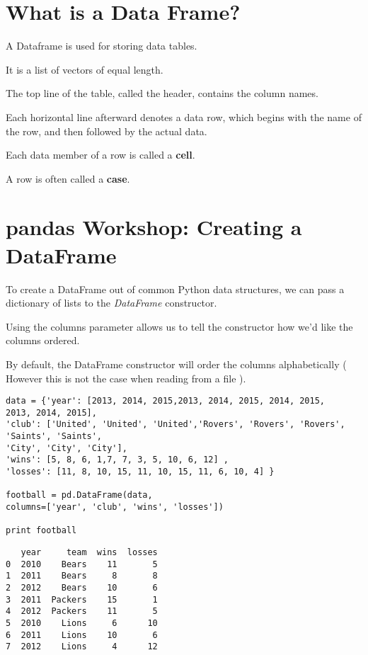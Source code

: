
 

\section*{What is a Data Frame?}
 
\item A Dataframe is used for storing data tables.
\item It is a list of vectors of equal length.
\item The top line of the table, called the header, contains the column names.
\item Each horizontal line afterward denotes a data row, which begins with the name of the row, and then followed by the actual data.
\item Each data member of a row is called a \textbf{cell}.
\item A row is often called a \textbf{case}.
 

\newpage
\section*{pandas Workshop: Creating a DataFrame}
 
\item To create a DataFrame out of common Python data structures, we can pass a dictionary of lists to the \textit{DataFrame} constructor.

\item Using the columns parameter allows us to tell the constructor how we'd like the columns ordered. 
\item By default, the DataFrame constructor will order the columns alphabetically ( However this is not the case when reading from a file ).
 


\begin{framed}
\begin{verbatim}
data = {'year': [2013, 2014, 2015,2013, 2014, 2015, 2014, 2015, 
2013, 2014, 2015],
'club': ['United', 'United', 'United','Rovers', 'Rovers', 'Rovers', 
'Saints', 'Saints', 
'City', 'City', 'City'],
'wins': [5, 8, 6, 1,7, 7, 3, 5, 10, 6, 12] ,
'losses': [11, 8, 10, 15, 11, 10, 15, 11, 6, 10, 4] }

football = pd.DataFrame(data,
columns=['year', 'club', 'wins', 'losses'])

print football
\end{verbatim}
\end{framed}

\begin{verbatim}
   year     team  wins  losses
0  2010    Bears    11       5
1  2011    Bears     8       8
2  2012    Bears    10       6
3  2011  Packers    15       1
4  2012  Packers    11       5
5  2010    Lions     6      10
6  2011    Lions    10       6
7  2012    Lions     4      12

\end{verbatim}


